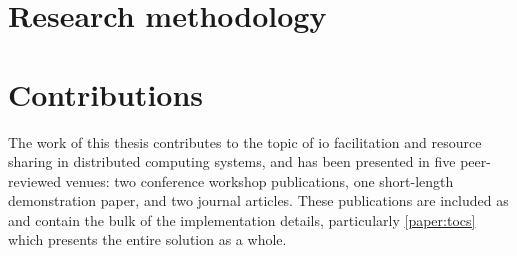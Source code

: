 \section{Research methodology}

\section{Contributions}
The work of this thesis contributes to the topic of \gls{io} facilitation and resource sharing in distributed computing systems, and has been presented in five peer-reviewed venues: two conference workshop publications, one short-length demonstration paper, and two journal articles.
These publications are included as  and contain the bulk of the implementation details, particularly \cref{paper:tocs} which presents the entire solution as a whole.

